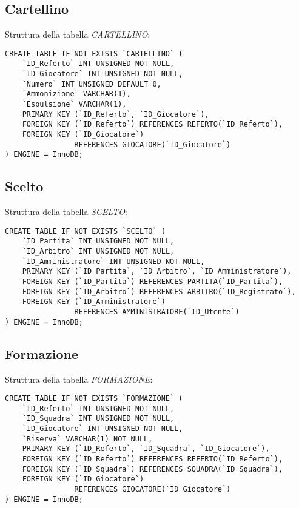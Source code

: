 \subsection{Cartellino}
Struttura della tabella \emph{CARTELLINO}:

\begin{lstlisting}
CREATE TABLE IF NOT EXISTS `CARTELLINO` (
	`ID_Referto` INT UNSIGNED NOT NULL,
	`ID_Giocatore` INT UNSIGNED NOT NULL,
	`Numero` INT UNSIGNED DEFAULT 0,
	`Ammonizione` VARCHAR(1),
	`Espulsione` VARCHAR(1),
	PRIMARY KEY (`ID_Referto`, `ID_Giocatore`),
	FOREIGN KEY (`ID_Referto`) REFERENCES REFERTO(`ID_Referto`),
	FOREIGN KEY (`ID_Giocatore`)
	            REFERENCES GIOCATORE(`ID_Giocatore`)
) ENGINE = InnoDB;
\end{lstlisting}

\subsection{Scelto}
Struttura della tabella \emph{SCELTO}:

\begin{lstlisting}
CREATE TABLE IF NOT EXISTS `SCELTO` (
	`ID_Partita` INT UNSIGNED NOT NULL,
	`ID_Arbitro` INT UNSIGNED NOT NULL,
	`ID_Amministratore` INT UNSIGNED NOT NULL,
	PRIMARY KEY (`ID_Partita`, `ID_Arbitro`, `ID_Amministratore`),
	FOREIGN KEY (`ID_Partita`) REFERENCES PARTITA(`ID_Partita`),
	FOREIGN KEY (`ID_Arbitro`) REFERENCES ARBITRO(`ID_Registrato`),
	FOREIGN KEY (`ID_Amministratore`)
	            REFERENCES AMMINISTRATORE(`ID_Utente`)
) ENGINE = InnoDB;
\end{lstlisting}

\subsection{Formazione}
Struttura della tabella \emph{FORMAZIONE}:

\begin{lstlisting}
CREATE TABLE IF NOT EXISTS `FORMAZIONE` (
	`ID_Referto` INT UNSIGNED NOT NULL,
	`ID_Squadra` INT UNSIGNED NOT NULL,
	`ID_Giocatore` INT UNSIGNED NOT NULL,
	`Riserva` VARCHAR(1) NOT NULL,
	PRIMARY KEY (`ID_Referto`, `ID_Squadra`, `ID_Giocatore`),
	FOREIGN KEY (`ID_Referto`) REFERENCES REFERTO(`ID_Referto`),
	FOREIGN KEY (`ID_Squadra`) REFERENCES SQUADRA(`ID_Squadra`),
	FOREIGN KEY (`ID_Giocatore`)
	            REFERENCES GIOCATORE(`ID_Giocatore`)
) ENGINE = InnoDB;
\end{lstlisting}

